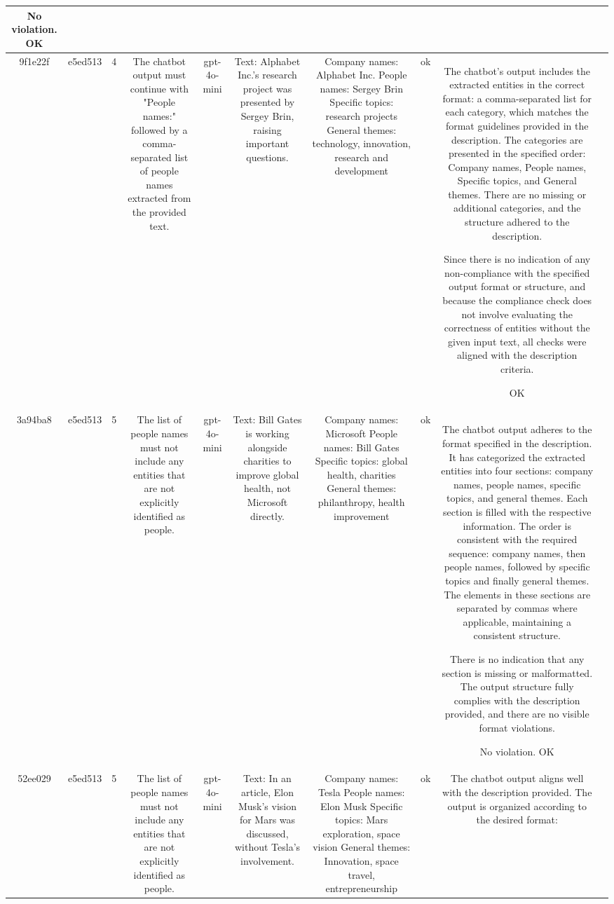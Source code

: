 \begin{table}[h!]
\begin{tabular}{|c|c|c|c|c|c|c|c|c|c|}
No violation.
OK & \\
\hline
9f1e22f & e5ed513 & 4 & The chatbot output must continue with "People names:" followed by a comma-separated list of people names extracted from the provided text. & gpt-4o-mini & Text: Alphabet Inc.'s research project was presented by Sergey Brin, raising important questions. & Company names: Alphabet Inc.
People names: Sergey Brin
Specific topics: research projects
General themes: technology, innovation, research and development & ok & The chatbot's output includes the extracted entities in the correct format: a comma-separated list for each category, which matches the format guidelines provided in the description. The categories are presented in the specified order: Company names, People names, Specific topics, and General themes. There are no missing or additional categories, and the structure adhered to the description. 

Since there is no indication of any non-compliance with the specified output format or structure, and because the compliance check does not involve evaluating the correctness of entities without the given input text, all checks were aligned with the description criteria.

OK & \\
\hline
3a94ba8 & e5ed513 & 5 & The list of people names must not include any entities that are not explicitly identified as people. & gpt-4o-mini & Text: Bill Gates is working alongside charities to improve global health, not Microsoft directly. & Company names: Microsoft
People names: Bill Gates
Specific topics: global health, charities
General themes: philanthropy, health improvement & ok & The chatbot output adheres to the format specified in the description. It has categorized the extracted entities into four sections: company names, people names, specific topics, and general themes. Each section is filled with the respective information. The order is consistent with the required sequence: company names, then people names, followed by specific topics and finally general themes. The elements in these sections are separated by commas where applicable, maintaining a consistent structure.

There is no indication that any section is missing or malformatted. The output structure fully complies with the description provided, and there are no visible format violations.

No violation.
OK & \\
\hline
52ee029 & e5ed513 & 5 & The list of people names must not include any entities that are not explicitly identified as people. & gpt-4o-mini & Text: In an article, Elon Musk's vision for Mars was discussed, without Tesla's involvement. & Company names: Tesla
People names: Elon Musk
Specific topics: Mars exploration, space vision
General themes: Innovation, space travel, entrepreneurship & ok & The chatbot output aligns well with the description provided. The output is organized according to the desired format:


\end{tabular}
\end{table}
